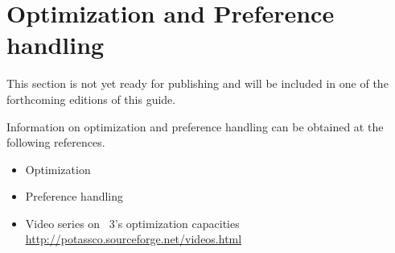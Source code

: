 
\section{Optimization and Preference handling}
\label{sec:prefopt}

This section is not yet ready for publishing
and will be included in one of the forthcoming editions of this guide.


Information on optimization and preference handling can be obtained at the following references.

\begin{itemize}
\item Optimization \cite{gekakasc11b,gekakasc11c,gekasc11b,ankamasc12a}
\item Preference handling \cite{brderosc14a,brderosc15a}
\item Video series on \clasp~3's optimization capacities \url{http://potassco.sourceforge.net/videos.html}
\end{itemize}

